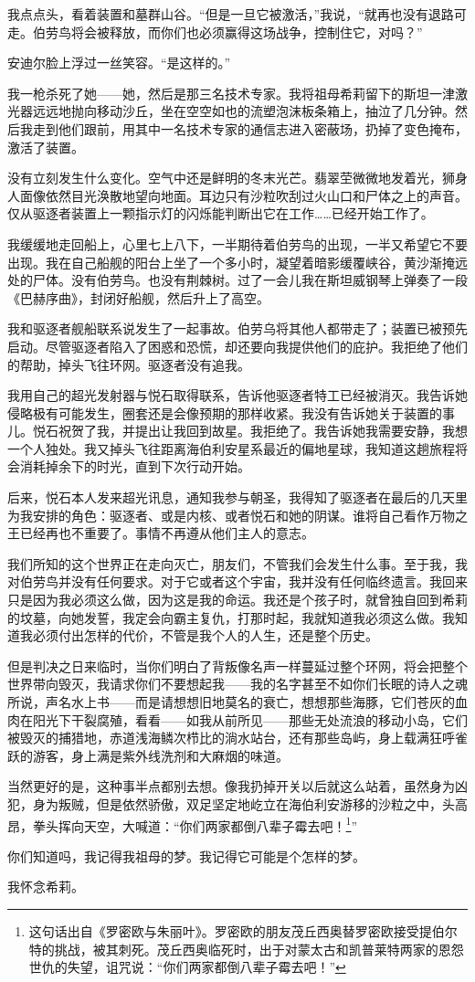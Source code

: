 \documentclass[AutoFakeBold=true]{book}
\begin{document}
{我点点头，看着装置和墓群山谷。``但是一旦它被激活，''我说，``就再也没有退路可走。伯劳鸟将会被释放，而你们也必须赢得这场战争，控制住它，对吗？''

安迪尔脸上浮过一丝笑容。``是这样的。''

我一枪杀死了她——她，然后是那三名技术专家。我将祖母希莉留下的斯坦一津激光器远远地抛向移动沙丘，坐在空空如也的流塑泡沫板条箱上，抽泣了几分钟。然后我走到他们跟前，用其中一名技术专家的通信志进入密蔽场，扔掉了变色掩布，激活了装置。

没有立刻发生什么变化。空气中还是鲜明的冬末光芒。翡翠茔微微地发着光，狮身人面像依然目光涣散地望向地面。耳边只有沙粒吹刮过火山口和尸体之上的声音。仅从驱逐者装置上一颗指示灯的闪烁能判断出它在工作……已经开始工作了。

我缓缓地走回船上，心里七上八下，一半期待着伯劳鸟的出现，一半又希望它不要出现。我在自己船舰的阳台上坐了一个多小时，凝望着暗影缓覆峡谷，黄沙渐掩远处的尸体。没有伯劳鸟。也没有荆棘树。过了一会儿我在斯坦威钢琴上弹奏了一段《巴赫序曲》，封闭好船舰，然后升上了高空。

我和驱逐者舰船联系说发生了一起事故。伯劳乌将其他人都带走了；装置已被预先启动。尽管驱逐者陷入了困惑和恐慌，却还要向我提供他们的庇护。我拒绝了他们的帮助，掉头飞往环网。驱逐者没有追我。

我用自己的超光发射器与悦石取得联系，告诉他驱逐者特工已经被消灭。我告诉她侵略极有可能发生，圈套还是会像预期的那样收紧。我没有告诉她关于装置的事儿。悦石祝贺了我，并提出让我回到故星。我拒绝了。我告诉她我需要安静，我想一个人独处。我又掉头飞往距离海伯利安星系最近的偏地星球，我知道这趟旅程将会消耗掉余下的时光，直到下次行动开始。

后来，悦石本人发来超光讯息，通知我参与朝圣，我得知了驱逐者在最后的几天里为我安排的角色：驱逐者、或是内核、或者悦石和她的阴谋。谁将自己看作万物之王已经再也不重要了。事情不再遵从他们主人的意志。

我们所知的这个世界正在走向灭亡，朋友们，不管我们会发生什么事。至于我，我对伯劳鸟并没有任何要求。对于它或者这个宇宙，我并没有任何临终遗言。我回来只是因为我必须这么做，因为这是我的命运。我还是个孩子时，就曾独自回到希莉的坟墓，向她发誓，我定会向霸主复仇，打那时起，我就知道我必须这么做。我知道我必须付出怎样的代价，不管是我个人的人生，还是整个历史。

但是判决之日来临时，当你们明白了背叛像名声一样蔓延过整个环网，将会把整个世界带向毁灭，我请求你们不要想起我——我的名字甚至不如你们长眠的诗人之魂所说，声名水上书——而是请想想旧地莫名的衰亡，想想那些海豚，它们苍灰的血肉在阳光下干裂腐殖，看看——如我从前所见——那些无处流浪的移动小岛，它们被毁灭的捕猎地，赤道浅海鳞次栉比的淌水站台，还有那些岛屿，身上载满狂呼雀跃的游客，身上满是紫外线洗剂和大麻烟的味道。

当然更好的是，这种事半点都别去想。像我扔掉开关以后就这么站着，虽然身为凶犯，身为叛贼，但是依然骄傲，双足坚定地屹立在海伯利安游移的沙粒之中，头高昂，拳头挥向天空，大喊道：``你们两家都倒八辈子霉去吧！\footnote{这句话出自《罗密欧与朱丽叶》。罗密欧的朋友茂丘西奥替罗密欧接受提伯尔特的挑战，被其刺死。茂丘西奥临死时，出于对蒙太古和凯普莱特两家的恩怨世仇的失望，诅咒说：``你们两家都倒八辈子霉去吧！''}''

你们知道吗，我记得我祖母的梦。我记得它可能是个怎样的梦。

我怀念希莉。}
\end{document}

